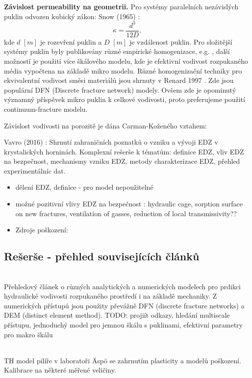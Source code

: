 \documentclass{article}
\begin{document}
{\bf Závislost permeability na geometrii.} Pro systémy paralelních nezávislých puklin odvozen kubický zákon: Snow (1965) \cite{Snow1965}:
\[
    \kappa=\frac{d^3}{12 D},
\] 
kde $d$ $[m]$ je rozevření puklin a $D$ $[m]$ je vzdálenost puklin. Pro složitější systémy puklin byly publikovány různé empirické homogenizace, e.g. \cite{Pouya2011}, další možností je použití více škálového modelu, kde je efektivní vodivost rozpukaného média vypočtena na základě mikro modelu. 
Různé homogenizační techniky pro ekvivalentní vodivost směsi materiálů jsou shrnuty v Renard 1997 \cite{Renard1997}.
Zde jsou populární DFN (Discrete fracture network) modely. Ovšem zde je opominutý významný příspěvek mikro puklin k celkové vodivosti, proto preferujeme použití continuum-fracture modelu.


Závislost vodivosti na porozitě je dána Carman-Koženého vztahem:

Vavro (2016) \cite{SURAO_50/2016}: Shrnutí zahraničních poznatků o vzniku a vývoji EDZ v krystalických horninách. Komplexní rešerše k tématům: definice EDZ, vliv EDZ na bezpečnost, mechanismy vzniku EDZ, metody charakterizace EDZ, přehled experimentálníc dat.

\begin{itemize}
    \item dělení EDZ, definice - pro model nepoužitelné
    \item možné pozitivní vlivy EDZ na bezpečnost \cite{Lanyon2011}: hydraulic cage, sorption surface on new fractures, ventilation of gasses, reduction of local transmissivity??
    \item Zdroje poškození:
    
\end{itemize}




\subsection{Rešerše - přehled souvisejících článků}
{\bf \cite{Shahbazi2020a}}\\
Přehledový článek o různých analytických a numerických modelech 
pro prdikci hydraulické vodivosti rozpukaného prostředí i na základě mechaniky. Z numerických přístupů 
jsou použity převážně DFN (discrete fracture networks) a DEM (distinct element method). 
TODO: projiít odkazy, hledání multiscale přístupu, jednoduchý model pro jemnou škálu s puklinami, 
efektivní parametry pro makro škálu

\\
TH model pilíře v laboratoři \"Asp\"o se zahrnutím plasticity a modelů poškození. 
Kalibrace na některé měřené veličiny.
\end{document}
